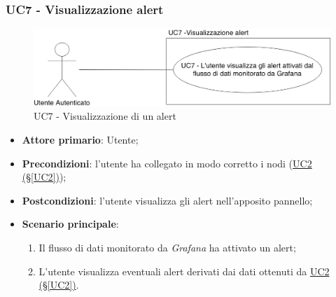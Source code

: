\pagebreak

\subsubsection{UC7 - Visualizzazione alert}\label{UC7}

\begin{figure}[H]
	\centering
	\includegraphics[scale=0.4]{./images/UC7.png}
	\caption{UC7 - Visualizzazione di un alert}
\end{figure}

\begin{itemize}
	\item \textbf{Attore primario}: Utente;
	\item \textbf{Precondizioni}: l'utente ha collegato in modo corretto i nodi 
	(\hyperref[UC2]{UC2 (§\ref*{UC2})});
	\item \textbf{Postcondizioni}: l'utente visualizza gli alert nell'apposito pannello;
	\item \textbf{Scenario principale}:
	\begin{enumerate}
		\item Il flusso di dati monitorato da \textit{Grafana} ha attivato un alert;
		\item L'utente visualizza eventuali alert derivati dai dati ottenuti da  \hyperref[UC2]{UC2 (§\ref*{UC2})}.
	\end{enumerate}
\end{itemize}

\pagebreak

